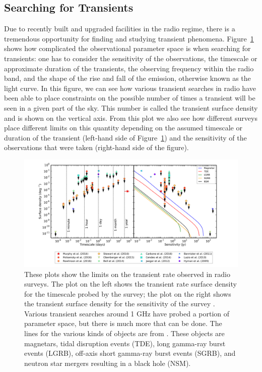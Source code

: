 \documentclass[12pt]{article}
\begin{document}
\subsection{Searching for Transients}

Due to recently built and upgraded facilities in the radio regime, there is a tremendous opportunity for finding and studying transient phenomena. Figure~\ref{murphy2017} \citep{2017MNRAS.466.1944M} shows how complicated the observational parameter space is when searching for transients: one has to consider the sensitivity of the observations, the timescale or approximate duration of the transients, the observing frequency within the radio band, and the shape of the rise and fall of the emission, otherwise known as the light curve. In this figure, we can see how various transient searches in radio have been able to place constraints on the possible number of times a transient will be seen in a given part of the sky. This number is called the transient surface density and is shown on the vertical axis. From this plot we also see how different surveys place different limits on this quantity depending on the assumed timescale or duration of the transient (left-hand side of Figure~\ref{murphy2017}) and the sensitivity of the observations that were taken (right-hand side of the figure). 

	\begin{figure}
		\includegraphics[width=\textwidth]{rates.png}
		\caption{These plots show the limits on the transient rate observed in radio surveys. The plot on the left shows the transient rate surface density for the timescale probed by the survey; the plot on the right shows the transient surface density for the sensitivity of the survey \citep{2017MNRAS.466.1944M}. Various transient searches around 1 GHz have probed a portion of parameter space, but there is much more that can be done. The lines for the various kinds of objects are from \citet{2015ApJ...806..224M}. These objects are magnetars, tidal disruption events (TDE), long gamma-ray burst events (LGRB), off-axis short gamma-ray burst events (SGRB), and neutron star mergers resulting in a black hole (NSM).}
		\label{murphy2017}
	\end{figure}
\end{document}
